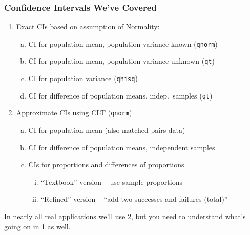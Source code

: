 \begin{frame}
	\frametitle{Confidence Intervals We've Covered}
	\begin{enumerate}
		\item Exact CIs based on assumption of Normality:
			\begin{enumerate}[(a)]
				\item CI for population mean, population variance known (\texttt{qnorm})
				\item CI for population mean, population variance unknown (\texttt{qt})
				\item CI for population variance (\texttt{qhisq})
				\item CI for difference of population means, indep.\ samples (\texttt{qt})
			\end{enumerate}
		\item Approximate CIs using CLT (\texttt{qnorm})
			\begin{enumerate}[(a)]
				\item CI for population mean (also matched pairs data)
				\item CI for difference of population means, independent samples
				\item CIs for proportions and differences of proportions 
					\begin{enumerate}[(i)]
						\item ``Textbook'' version -- use sample proportions
						\item ``Refined'' version -- ``add two successes and failures (total)''			
					\end{enumerate}
			\end{enumerate}
	\end{enumerate}
  \alert{In nearly all real applications we'll use 2, but you need to understand what's going on in 1 as well.}
\end{frame}

